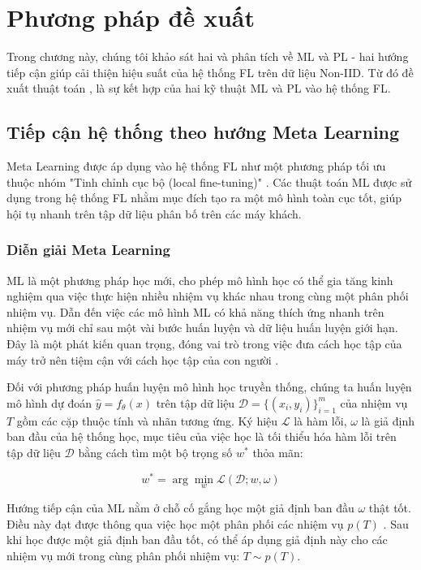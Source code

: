 \chapter{Phương pháp đề xuất}
\label{Chapter3}

Trong chương này, chúng tôi khảo sát hai và phân tích về ML và PL - hai hướng tiếp cận giúp cải thiện hiệu suất của hệ thống FL trên dữ liệu Non-IID. Từ đó đề xuất thuật toán , là sự kết hợp của hai kỹ thuật ML và PL vào hệ thống FL.

\section{Tiếp cận hệ thống theo hướng Meta Learning}

Meta Learning được áp dụng vào hệ thống FL như một phương pháp tối ưu thuộc nhóm "Tinh chỉnh cục bộ (local fine-tuning)" \cite{zhu2021federated}. Các thuật toán ML được sử dụng trong hệ thống FL nhằm mục đích tạo ra một mô hình toàn cục tốt, giúp hội tụ nhanh trên tập dữ liệu phân bố trên các máy khách.

\subsection{Diễn giải Meta Learning}

ML là một phương pháp học mới, cho phép mô hình học có thể gia tăng kinh nghiệm qua việc thực hiện nhiều nhiệm vụ khác nhau trong cùng một phân phối nhiệm vụ. Dẫn đến việc các mô hình ML có khả năng thích ứng nhanh trên nhiệm vụ mới chỉ sau một vài bước huấn luyện và dữ liệu huấn luyện giới hạn. Đây là một phát kiến quan trọng, đóng vai trò trong việc đưa cách học tập của máy trở nên tiệm cận với cách học tập của con người .

Đối với phương pháp huấn luyện mô hình học truyền thống, chúng ta huấn luyện mô hình dự đoán $\hat{y} = f_\theta(x)$ trên tập dữ liệu $\mathcal{D} = \{ (x_i, y_i)\}_{i=1}^m$ của nhiệm vụ $T$ gồm các cặp thuộc tính và nhãn tương ứng. Ký hiệu $\mathcal{L}$ là hàm lỗi, $\omega$ là giả định ban đầu của hệ thống học, mục tiêu của việc học là tối thiểu hóa hàm lỗi trên tập dữ liệu $\mathcal{D}$ bằng cách tìm một bộ trọng số $w^*$ thỏa mãn:

\begin{equation}
    w^* = \arg \min_w \mathcal{L}(\mathcal{D}; w, \omega)
\end{equation}

Hướng tiếp cận của ML nằm ở chỗ cố gắng học một giả định ban đầu $\omega$ thật tốt. Điều này đạt được thông qua việc học một phân phối các nhiệm vụ $p(T)$ \cite{hospedales2020meta}. Sau khi học được một giả định ban đầu tốt, có thể áp dụng giả định này cho các nhiệm vụ mới trong cùng phân phối nhiệm vụ: $T \sim p(T)$.

